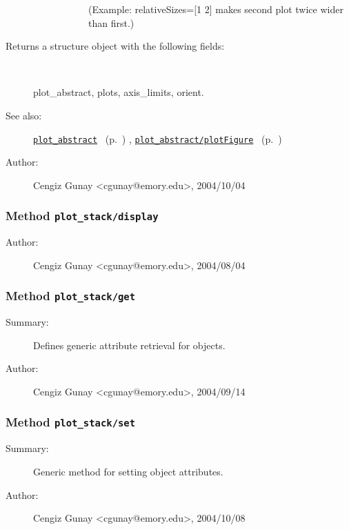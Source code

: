 \begin{description}
\begin{description}
\begin{description}
(Example: relativeSizes=[1 2] makes second plot twice wider than first.)\end{description}%
\end{description}%
%
\item[Returns a structure object with the following fields:]~

	plot\_abstract, plots, axis\_limits, orient.
%
%
\item[See also:]%
\hyperlink{ref_plot_abstract}{\texttt{plot\_abstract}}%
\ (p.~\pageref{ref_plot_abstract})%
%
, \hyperlink{ref_plot_abstract__plotFigure}{\texttt{plot\_abstract/plotFigure}}%
\ (p.~\pageref{ref_plot_abstract__plotFigure})%
%
%
\item[Author:]%
Cengiz Gunay <cgunay@emory.edu>, 2004/10/04%
\end{description}
\methodline%
\subsubsection[Method \texttt{display}]{Method \texttt{plot\_stack/display}}%
%
\label{ref_plot_stack__display}%
\hypertarget{ref_plot_stack__display}{}%
\begin{description}
%
%
%
%
%
%
%
\item[Author:]%
Cengiz Gunay <cgunay@emory.edu>, 2004/08/04%
\end{description}
\methodline%
\subsubsection[Method \texttt{get}]{Method \texttt{plot\_stack/get}}%
%
\label{ref_plot_stack__get}%
\hypertarget{ref_plot_stack__get}{}%
\begin{description}
\item[Summary:]Defines generic attribute retrieval for objects.
%
%
%
%
%
%
%
\item[Author:]%
Cengiz Gunay <cgunay@emory.edu>, 2004/09/14%
\end{description}
\methodline%
\subsubsection[Method \texttt{set}]{Method \texttt{plot\_stack/set}}%
%
\label{ref_plot_stack__set}%
\hypertarget{ref_plot_stack__set}{}%
\begin{description}
\item[Summary:]Generic method for setting object attributes.
%
%
%
%
%
%
%
\item[Author:]%
Cengiz Gunay <cgunay@emory.edu>, 2004/10/08%
\end{description}
\methodline%
